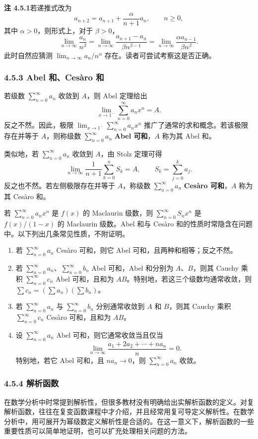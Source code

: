 \noindent\textbf{注 4.5.1}\quad 若递推式改为
\[
a_{n+2}=a_{n+1}+\frac{\alpha}{n+1}a_n,\qquad n\geq0,
\]
其中 $\alpha>0$，则形式上，对于 $\beta>0$，
\[
\lim_{n\to\infty}\frac{a_n}{n^\beta}
=\lim_{n\to\infty}\frac{a_{n+1}-a_n}{\beta n^{\beta-1}}
=\lim_{n\to\infty}\frac{\alpha a_{n-1}}{\beta n^\beta}.
\]
此时自然应猜测 $\lim_{n\to\infty}a_n/n^\alpha$ 存在。读者可尝试考察这是否正确。

\subsubsection*{4.5.3 Abel 和、Ces\`aro 和}

若级数 $\sum_{n=0}^{\infty}a_n$ 收敛到 $A$，则 Abel 定理给出
\[
\lim_{x\to1^-}\sum_{n=0}^{\infty}a_nx^n=A.
\]
反之不然。因此，极限 $\lim_{x\to1^-}\sum_{n=0}^{\infty}a_nx^n$ 推广了通常的求和概念。若该极限存在并等于 $A$，则称级数 $\sum_{n=0}^{\infty}a_n$ \textbf{Abel 可和}，$A$ 称为其 Abel 和。

类似地，若 $\sum_{n=0}^{\infty}a_n$ 收敛到 $A$，由 Stolz 定理可得
\[
\lim_{n\to\infty}\frac1{n+1}\sum_{k=0}^{n}S_k=A,
\qquad S_k=\sum_{j=0}^{k}a_j.
\]
反之也不然。若左侧极限存在并等于 $A$，称级数 $\sum_{n=0}^{\infty}a_n$ \textbf{Ces\`aro 可和}，$A$ 称为其 Ces\`aro 和。

若 $\sum_{n=0}^{\infty}a_nx^n$ 是 $f(x)$ 的 Maclaurin 级数，则 $\sum_{n=0}^{\infty}S_nx^n$ 是 $f(x)/(1-x)$ 的 Maclaurin 级数。Abel 和与 Ces\`aro 和的性质时常隐含在问题中。以下列出几条常见性质，不附证明。
\begin{enumerate}[label=（\roman*）,leftmargin=3em]
\item 若 $\sum_{n=0}^{\infty}a_n$ Ces\`aro 可和，则它 Abel 可和，且两种和相等；反之不然。
\item 若 $\sum_{n=0}^{\infty}a_n$、$\sum_{n=0}^{\infty}b_n$ Abel 可和，Abel 和分别为 $A$、$B$，则其 Cauchy 乘积 $\sum_{n=0}^{\infty}c_n$ Abel 可和，且和为 $AB$。特别地，若这三个级数均通常收敛，则 $\sum c_n=(\sum a_n)(\sum b_n)$。
\item 若 $\sum_{n=0}^{\infty}a_n$ 与 $\sum_{n=0}^{\infty}b_n$ 分别通常收敛到 $A$ 和 $B$，则其 Cauchy 乘积 $\sum_{n=0}^{\infty}c_n$ Ces\`aro 可和，且和为 $AB$。
\item 设 $\sum_{n=0}^{\infty}a_n$ Abel 可和，则它通常收敛当且仅当
\[
\lim_{n\to\infty}\frac{a_1+2a_2+\cdots+na_n}{n}=0.
\]
特别地，若它 Abel 可和，且 $na_n\to0$，则 $\sum_{n=0}^{\infty}a_n$ 收敛。
\end{enumerate}

\subsubsection*{4.5.4 解析函数}

在数学分析中时常提到解析性，但很多教材没有明确给出实解析函数的定义。对复解析函数，往往在复变函数课程中才介绍，并且经常用复可导定义解析性。在数学分析中，用可展开为幂级数定义解析性是合适的。在这一意义下，解析函数的一些重要性质可以简单地证明，也可以扩充处理相关问题的方法。
